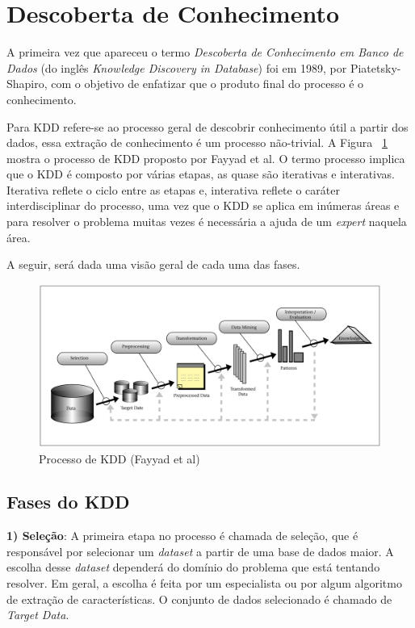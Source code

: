 \section{Descoberta de Conhecimento}
A primeira vez que apareceu o termo \textit{Descoberta de Conhecimento em Banco de Dados} (do inglês \textit{Knowledge Discovery in Database}) foi em 1989, por Piatetsky-Shapiro, com o objetivo de enfatizar que o produto final do processo é o conhecimento.

Para \cite{fayyad:1996} KDD refere-se ao processo geral de descobrir conhecimento útil a partir dos dados, essa extração de conhecimento é um processo não-trivial. 
A Figura ~\ref{fig:kdd} mostra o processo de KDD proposto por Fayyad et al. 
O termo processo implica que o KDD é composto por várias etapas, as quase são iterativas e interativas. 
Iterativa reflete o ciclo entre as etapas e, interativa reflete o caráter interdisciplinar do processo, uma vez que o KDD se aplica em inúmeras áreas e para resolver o problema muitas vezes é necessária a ajuda de um \textit{expert} naquela área.

A seguir, será dada uma visão geral de cada uma das fases.


\begin{figure}
    \centering
    \includegraphics[scale=0.39]{Imagens/kdd.png}
    \caption{Processo de KDD (Fayyad et al)}
    \label{fig:kdd}
\end{figure}

\subsection{Fases do KDD}
\textbf{1) Seleção}: A primeira etapa no processo é chamada de seleção, que é responsável por selecionar um \textit{dataset} a partir de uma base de dados maior. A escolha desse \textit{dataset} dependerá do domínio do problema que está tentando resolver. Em geral, a escolha é feita por um especialista ou por algum algoritmo de extração de características. O conjunto de dados selecionado é chamado de \textit{Target Data}.

